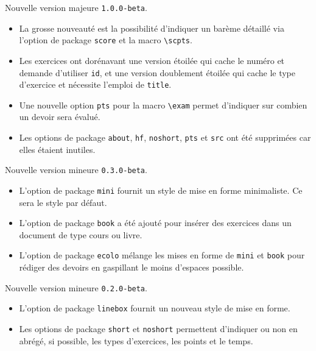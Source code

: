\documentclass[12pt,a4paper]{scrartcl}
\theoremstyle{definition}
\begin{document}
\begin{description}[leftmargin=1em]
    \setlength\itemsep{1em}
    \item[2017-12-13] Nouvelle version majeure \verb+1.0.0-beta+.
        \begin{itemize}
            \item La grosse nouveauté est la possibilité d'indiquer un barème détaillé via l'option de package \verb+score+ et la macro \verb+\scpts+.

            \item Les exercices ont dorénavant une version étoilée qui cache le numéro et demande d'utiliser \verb+id+, et une version doublement étoilée qui cache le type d'exercice et nécessite l'emploi de \verb+title+.

            \item Une nouvelle option \verb+pts+ pour la macro \verb+\exam+ permet d'indiquer sur combien un devoir sera évalué.

            \item Les options de package \verb+about+, \verb+hf+, \verb+noshort+, \verb+pts+ et \verb+src+ ont été supprimées car elles étaient inutiles.
        \end{itemize}


    \item[2017-12-02] Nouvelle version mineure \verb+0.3.0-beta+.
    \begin{itemize}
        \item L'option de package \verb+mini+ fournit un style de mise en forme minimaliste. Ce sera le style par défaut.

        \item L'option de package \verb+book+ a été ajouté pour insérer des exercices dans un document de type cours ou livre.

        \item L'option de package \verb+ecolo+ mélange les mises en forme de \verb+mini+ et \verb+book+ pour rédiger des devoirs en gaspillant le moins d'espaces possible.
    \end{itemize}


    \item[2017-11-28] Nouvelle version mineure \verb+0.2.0-beta+.
    \begin{itemize}
        \item L'option de package \verb+linebox+ fournit un nouveau style de mise en forme.

        \item Les options de package \verb+short+ et \verb+noshort+ permettent d'indiquer ou non en abrégé, si possible, les types d'exercices, les points et le temps.


\end{itemize}
\end{description}
\end{document}
